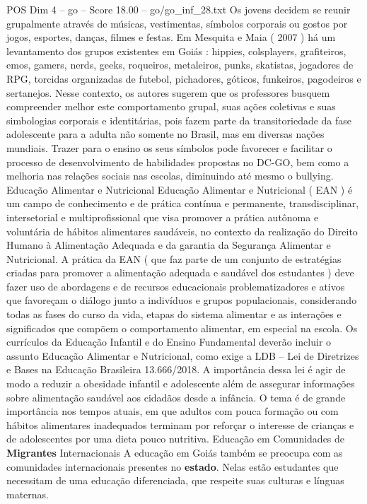 \begin{textsample}{POS Dim 4 – go – Score 18.00 – go/go\_inf\_28.txt}
Os jovens decidem se reunir grupalmente através de músicas, vestimentas, símbolos corporais ou gostos por jogos, esportes, danças, filmes e festas.
Em Mesquita e Maia ( 2007 ) há um levantamento dos grupos existentes em Goiás : hippies, colsplayers, grafiteiros, emos, gamers, nerds, geeks, roqueiros, metaleiros, punks, skatistas, jogadores de RPG, torcidas organizadas de futebol, pichadores, góticos, funkeiros, pagodeiros e sertanejos.
Nesse contexto, os autores sugerem que os professores busquem compreender melhor este comportamento grupal, suas ações coletivas e suas simbologias corporais e identitárias, pois fazem parte da transitoriedade da fase adolescente para a adulta não somente no Brasil, mas em diversas nações mundiais.
Trazer para o ensino os seus símbolos pode favorecer e facilitar o processo de desenvolvimento de habilidades propostas no DC-GO, bem como a melhoria nas relações sociais nas escolas, diminuindo até mesmo o bullying.
Educação Alimentar e Nutricional Educação Alimentar e Nutricional ( EAN ) é um campo de conhecimento e de prática contínua e permanente, transdisciplinar, intersetorial e multiprofissional que visa promover a prática autônoma e voluntária de hábitos alimentares saudáveis, no contexto da realização do Direito Humano à Alimentação Adequada e da garantia da Segurança Alimentar e Nutricional.
A prática da EAN ( que faz parte de um conjunto de estratégias criadas para promover a alimentação adequada e saudável dos estudantes ) deve fazer uso de abordagens e de recursos educacionais problematizadores e ativos que favoreçam o diálogo junto a indivíduos e grupos populacionais, considerando todas as fases do curso da vida, etapas do sistema alimentar e as interações e significados que compõem o comportamento alimentar, em especial na escola.
Os currículos da Educação Infantil e do Ensino Fundamental deverão incluir o assunto Educação Alimentar e Nutricional, como exige a LDB – Lei de Diretrizes e Bases na Educação Brasileira 13.666/2018.
A importância dessa lei é agir de modo a reduzir a obesidade infantil e adolescente além de assegurar informações sobre alimentação saudável aos cidadãos desde a infância.
O tema é de grande importância nos tempos atuais, em que adultos com pouca formação ou com hábitos alimentares inadequados terminam por reforçar o interesse de crianças e de adolescentes por uma dieta pouco nutritiva.
Educação em Comunidades de \textbf{Migrantes} Internacionais A educação em Goiás também se preocupa com as comunidades internacionais presentes no \textbf{estado}.
Nelas estão estudantes que necessitam de uma educação diferenciada, que respeite suas culturas e línguas maternas.

\end{textsample}
